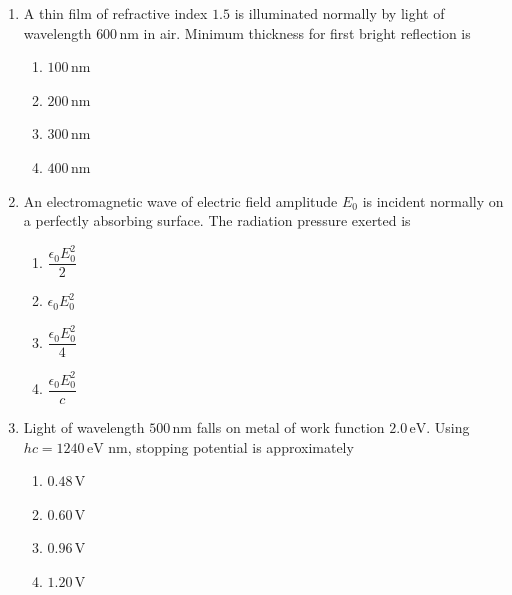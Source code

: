 \documentclass[12pt]{article}
\begin{document}
\begin{enumerate}
To first order in $u/c$, the image formed in laboratory frame is

\begin{enumerate}
\item at distance $2f$ and moving away
\item at distance $2f$ and stationary
\item at distance $2f\left(1+\dfrac{u}{c}\right)$
\item at distance $2f\left(1-\dfrac{u}{c}\right)$
\end{enumerate}

\item A thin film of refractive index $1.5$ is illuminated normally by light of wavelength $600\,\text{nm}$ in air. Minimum thickness for first bright reflection is

\begin{enumerate}
\item $100\,\text{nm}$
\item $200\,\text{nm}$
\item $300\,\text{nm}$
\item $400\,\text{nm}$
\end{enumerate}

\item An electromagnetic wave of electric field amplitude $E_0$ is incident normally on a perfectly absorbing surface. The radiation pressure exerted is

\begin{enumerate}
\item $\dfrac{\epsilon_0 E_0^2}{2}$
\item $\epsilon_0 E_0^2$
\item $\dfrac{\epsilon_0 E_0^2}{4}$
\item $\dfrac{\epsilon_0 E_0^2}{c}$
\end{enumerate}

\item Light of wavelength $500\,\text{nm}$ falls on metal of work function $2.0\,\text{eV}$. Using $hc=1240\,\text{eV nm}$, stopping potential is approximately

\begin{enumerate}
\item $0.48\,\text{V}$
\item $0.60\,\text{V}$
\item $0.96\,\text{V}$
\item $1.20\,\text{V}$
\end{enumerate}


\end{enumerate}
\end{document}
